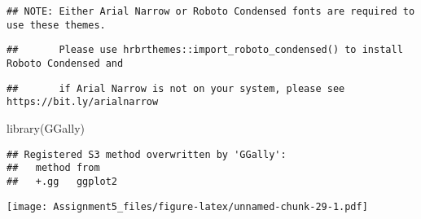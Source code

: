 \documentclass[
]{article}
\newenvironment{Shaded}{\begin{snugshade}}{\end{snugshade}}
\newcommand{\AttributeTok}[1]{\textcolor[rgb]{0.77,0.63,0.00}{#1}}
\newcommand{\ConstantTok}[1]{\textcolor[rgb]{0.00,0.00,0.00}{#1}}
\newcommand{\DecValTok}[1]{\textcolor[rgb]{0.00,0.00,0.81}{#1}}
\newcommand{\FunctionTok}[1]{\textcolor[rgb]{0.00,0.00,0.00}{#1}}
\newcommand{\NormalTok}[1]{#1}
\newcommand{\OtherTok}[1]{\textcolor[rgb]{0.56,0.35,0.01}{#1}}
\newcommand{\SpecialCharTok}[1]{\textcolor[rgb]{0.00,0.00,0.00}{#1}}
\newcommand{\StringTok}[1]{\textcolor[rgb]{0.31,0.60,0.02}{#1}}
\begin{document}
\begin{verbatim}
## NOTE: Either Arial Narrow or Roboto Condensed fonts are required to use these themes.
\end{verbatim}

\begin{verbatim}
##       Please use hrbrthemes::import_roboto_condensed() to install Roboto Condensed and
\end{verbatim}

\begin{verbatim}
##       if Arial Narrow is not on your system, please see https://bit.ly/arialnarrow
\end{verbatim}

\begin{Shaded}
\begin{Highlighting}[]
\FunctionTok{library}\NormalTok{(GGally)}
\end{Highlighting}
\end{Shaded}

\begin{verbatim}
## Registered S3 method overwritten by 'GGally':
##   method from   
##   +.gg   ggplot2
\end{verbatim}

\begin{Shaded}
\end{Shaded}

\texttt{[image: Assignment5\_files/figure-latex/unnamed-chunk-29-1.pdf]}
\end{document}
